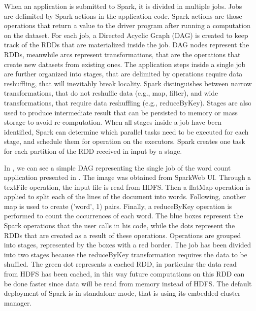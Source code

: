 When an application is submitted to Spark, it is divided in multiple jobs. Jobs are delimited by Spark actions in the application code. Spark actions are those operations that return a value to the driver program after running a computation on the dataset.
For each job, a Directed Acyclic Graph (DAG) is created to keep track of the RDDs that are materialized inside the job. DAG nodes represent the RDDs, meanwhile arcs represent transformations, that are the operations that create new datasets from existing ones.
The application steps inside a single job are further organized into stages, that are delimited by operations require data reshuffling, that will inevitably break locality.  Spark distinguishes between narrow transformations, that do not reshuffle data (e.g., map, filter), and wide transformations, that require data reshuffling (e.g., reduceByKey). Stages are also used to produce intermediate result that can be persisted
to memory or mass storage to avoid re-computation. When all stages inside a job
have been identified, Spark can determine which parallel tasks need to be executed for each stage, and schedule them for operation on the executors. Spark creates one task for each partition of the RDD received in input by a stage.



In , we can see a simple DAG representing the single job
of the word count application presented in  \cite{misc:SparkApplication}. The image was obtained from SparkWeb UI. Through a textFile operation, the input file is read from HDFS. Then a flatMap operation is applied to split each of the lines of the document into words. Following, another
map is used to create (’word’, 1) pairs. Finally, a reduceByKey operation is performed  to count the occurrences of each word. The blue boxes represent the Spark operations that the user calls in his code, while the dots represent the RDDs that are created as a result of these operations. Operations are grouped into stages, represented by the boxes with a red border. The job has been divided into two stages because the reduceByKey transformation requires the data to be shuffled. The green dot represents a cached RDD, in particular the data read from HDFS has been cached, in this way future computations on this RDD can be done faster since data will be read from memory instead of HDFS. The default deployment of Spark is in standalone mode, that is using its embedded cluster manager. 

